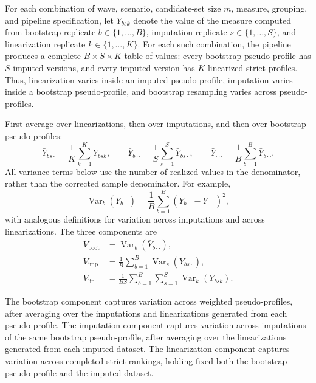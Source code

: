\documentclass[12pt]{article}
\begin{document}
For each combination of wave, scenario, candidate-set size \(m\), measure,
grouping, and pipeline specification, let \(Y_{bsk}\) denote the value of the
measure computed from bootstrap replicate \(b\in\{1,\ldots,B\}\), imputation
replicate \(s\in\{1,\ldots,S\}\), and linearization replicate
\(k\in\{1,\ldots,K\}\). For each such combination, the pipeline produces a
complete \(B\times S\times K\) table of values: every bootstrap pseudo-profile
has \(S\) imputed versions, and every imputed version has \(K\) linearized
strict profiles. Thus, linearization varies inside an imputed pseudo-profile,
imputation varies inside a bootstrap pseudo-profile, and bootstrap resampling
varies across pseudo-profiles.

First average over linearizations, then over imputations, and then over
bootstrap pseudo-profiles:
\[
\bar Y_{bs\cdot}
=
\frac{1}{K}\sum_{k=1}^{K}Y_{bsk},
\qquad
\bar Y_{b\cdot\cdot}
=
\frac{1}{S}\sum_{s=1}^{S}\bar Y_{bs\cdot},
\qquad
\bar Y_{\cdot\cdot\cdot}
=
\frac{1}{B}\sum_{b=1}^{B}\bar Y_{b\cdot\cdot}.
\]
All variance terms below use the number of realized values in the denominator,
rather than the corrected sample denominator. For example,
\[
\operatorname{Var}_b(\bar Y_{b\cdot\cdot})
=
\frac{1}{B}\sum_{b=1}^{B}
\left(\bar Y_{b\cdot\cdot}-\bar Y_{\cdot\cdot\cdot}\right)^2,
\]
with analogous definitions for variation across imputations and across
linearizations. The three components are
\[
\begin{aligned}
V_{\mathrm{boot}}
&=
\operatorname{Var}_b(\bar Y_{b\cdot\cdot}),\\
V_{\mathrm{imp}}
&=
\frac{1}{B}\sum_{b=1}^{B}
\operatorname{Var}_s(\bar Y_{bs\cdot}),\\
V_{\mathrm{lin}}
&=
\frac{1}{BS}\sum_{b=1}^{B}\sum_{s=1}^{S}
\operatorname{Var}_k(Y_{bsk}).
\end{aligned}
\]

The bootstrap component captures variation across weighted pseudo-profiles,
after averaging over the imputations and linearizations generated from each
pseudo-profile. The imputation component captures variation across imputations
of the same bootstrap pseudo-profile, after averaging over the linearizations
generated from each imputed dataset. The linearization component captures
variation across completed strict rankings, holding fixed both the bootstrap
pseudo-profile and the imputed dataset.
\end{document}
